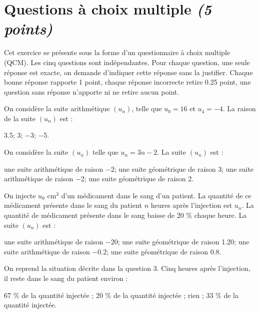 \section{Questions à choix multiple \textit{(5 points)}}

Cet exercice se présente sous la forme d'un questionnaire à choix multiple (QCM). Les cinq questions sont indépendantes. Pour chaque question, une seule réponse est exacte, on demande d'indiquer cette réponse sans la justifier. Chaque bonne réponse rapporte 1 point, chaque réponse incorrecte retire \num{0.25} point, une question sans réponse n'apporte ni ne retire aucun point.

\begin{questions}
	\question[1] On considère la suite arithmétique $(u_n)$, telle que $u_0 = 16$ et $u_4 = -4$. La raison de la suite $(u_n)$ est :
	
	\begin{oneparcheckboxes}
		\choice \num{3.5};
		\choice \num{3};
		\choice \num{-3};
		\CorrectChoice \num{-5}.
	\end{oneparcheckboxes} 

	\question[1] On considère la suite $(u_n)$ telle que $u_n = 3n - 2$. La suite $(u_n)$ est :
	
	\begin{checkboxes}
		\choice une suite arithmétique de raison \num{-2};
		\choice une suite géométrique de raison \num{3};
		\correctchoice une suite arithmétique de raison \num{-2};
		\choice une suite géométrique de raison \num{2}.
	\end{checkboxes}

	\question[1] On injecte $u_0$ cm$^3$ d'un médicament dans le sang d'un patient. La quantité de ce médicament présente dans le sang du patient $n$ heures après l'injection est $u_n$. La quantité de médicament présente dans le sang baisse de 20 \% chaque heure.
	La suite $(u_n)$ est :
	
	\begin{checkboxes}
		\choice une suite arithmétique de raison \num{-20};
		\choice une suite géométrique de raison \num{1.20};
		\choice une suite arithmétique de raison \num{-0.2};
		\correctchoice une suite géométrique de raison \num{0.8}.
	\end{checkboxes}

	\question[1] On reprend la situation décrite dans la question 3. Cinq heures après l'injection, il reste dans le sang du patient environ :
	
	\begin{checkboxes}
		\choice \num{67} \% de la quantité injectée ;
		\choice \num{20} \% de la quantité injectée ;
		\choice rien ;
		\CorrectChoice \num{33} \% de la quantité injectée.
	\end{checkboxes}


\end{questions}
